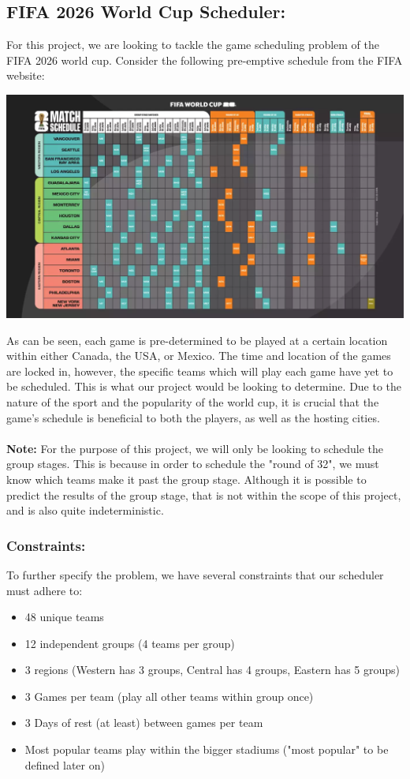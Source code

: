 \documentclass[letterpaper,10pt]{article}
\begin{document}
\subsection*{FIFA 2026 World Cup Scheduler:} 
For this project, we are looking to tackle the game scheduling problem of the FIFA 2026 world cup. Consider the following pre-emptive schedule from the FIFA website: 
\begin{center}
\includegraphics[scale=0.35]{schedule.png}
\end{center}
As can be seen, each game is pre-determined to be played at a certain location within either Canada, the USA, or Mexico. The time and location of the games are locked in, however, the specific teams which will play each game have yet to be scheduled. This is what our project would be looking to determine. Due to the nature of the sport and the popularity of the world cup, it is crucial that the game's schedule is beneficial to both the players, as well as the hosting cities. \\\\
\textbf{Note: }For the purpose of this project, we will only be looking to schedule the group stages. This is because in order to schedule the "round of 32", we must know which teams make it past the group stage. Although it is possible to predict the results of the group stage, that is not within the scope of this project, and is also quite indeterministic. 

\subsubsection*{Constraints:} 
To further specify the problem, we have several constraints that our scheduler must adhere to:
\begin{itemize}
\itemsep0em 
\item 48 unique teams
\item 12 independent groups (4 teams per group)
\item 3 regions (Western has 3 groups, Central has 4 groups, Eastern has 5 groups)
\item 3 Games per team (play all other teams within group once)
\item 3 Days of rest (at least) between games per team
\item Most popular teams play within the bigger stadiums ("most popular" to be defined later on)
\end{itemize}
\end{document}

